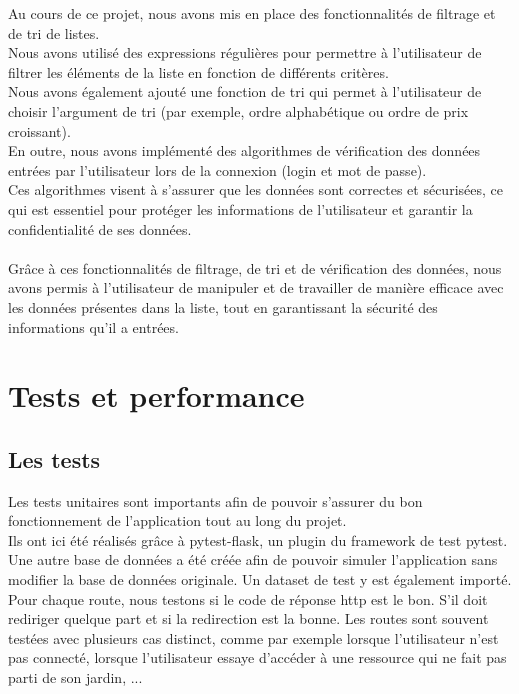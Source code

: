 \documentclass[12pt,titlepage]{report}
\begin{document}
Au cours de ce projet, nous avons mis en place des fonctionnalités de filtrage et de tri de listes.\\
Nous avons utilisé des expressions régulières pour permettre à l'utilisateur de filtrer les éléments de la liste en fonction de différents critères.\\
Nous avons également ajouté une fonction de tri qui permet à l'utilisateur de choisir l'argument de tri (par exemple, ordre alphabétique ou ordre de prix croissant).\\

En outre, nous avons implémenté des algorithmes de vérification des données entrées par l'utilisateur lors de la connexion (login et mot de passe).\\
Ces algorithmes visent à s'assurer que les données sont correctes et sécurisées, ce qui est essentiel pour protéger les informations de l'utilisateur et garantir la confidentialité de ses données.\\ \\
Grâce à ces fonctionnalités de filtrage, de tri et de vérification des données, nous avons permis à l'utilisateur de manipuler et de travailler de manière efficace avec les données présentes dans la liste, tout en garantissant la sécurité des informations qu'il a entrées.


\chapter{Tests et performance}

\section{Les tests}

Les tests unitaires sont importants afin de pouvoir s'assurer du bon fonctionnement de l'application tout au long du projet. \\

Ils ont ici été réalisés grâce à pytest-flask, un plugin du framework de test pytest. Une autre base de données a été créée afin de pouvoir simuler l’application sans modifier la base de données originale. Un dataset de test y est également importé.
Pour chaque route, nous testons si le code de réponse http est le bon. S’il doit rediriger quelque part et si la redirection est la bonne. Les routes sont souvent testées avec plusieurs cas distinct, comme par exemple lorsque l'utilisateur n'est pas connecté, lorsque l'utilisateur essaye d'accéder à une ressource qui ne fait pas parti de son jardin, ...
\end{document}
